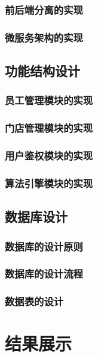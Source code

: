 \documentclass{ctexart}
\begin{document}
\subsubsection{前后端分离的实现}
\subsubsection{微服务架构的实现}

\subsection{功能结构设计}
\subsubsection{员工管理模块的实现}
\subsubsection{门店管理模块的实现}
\subsubsection{用户鉴权模块的实现}
\subsubsection{算法引擎模块的实现}

\subsection{数据库设计}
\subsubsection{数据库的设计原则}
\subsubsection{数据库的设计流程}
\subsubsection{数据表的设计}


\section{结果展示}
\end{document}
